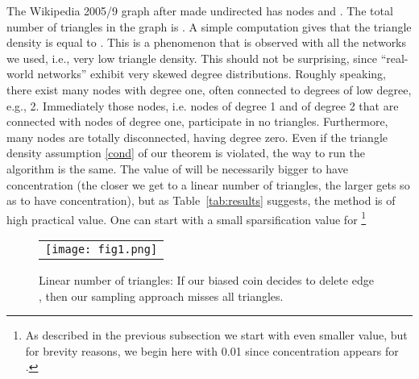 \documentclass{llncs}
\begin{document}
The Wikipedia 2005/9 graph after made undirected has  nodes 
and . The total number of triangles in the graph is .
A simple computation gives that the triangle density  is 
equal to . This is a phenomenon that is observed with all the 
networks we used, i.e., very low triangle density. This should not be surprising, 
since ``real-world networks'' exhibit very skewed degree distributions. 
Roughly speaking, there exist many nodes with degree one, often connected to degrees of low
degree, e.g., 2. Immediately those nodes, i.e. nodes of degree 1 and of degree 2 that 
are connected with nodes of degree one, participate in no triangles. Furthermore, 
many nodes are totally disconnected, having degree zero. 
Even if the triangle density assumption  \eqref{cond} of our theorem is violated, 
the way to run the algorithm is the same. The value of  will be necessarily bigger
to have concentration (the closer we get to a linear number of triangles, the larger  gets
so as to have concentration), but as Table~\ref{tab:results} suggests, the method 
is of high practical value. 
One can start with a small sparsification value for  \footnote{As described in the previous
subsection we start with even smaller value, but for brevity reasons, we begin here with 0.01 since concentration
appears for .}

\begin{figure}
    \begin{center}
        \begin{tabular}{c}
        \texttt{[image: fig1.png]} \\
	  \end{tabular}	    
		\caption{ Linear number of triangles: If our biased coin decides to delete edge , then our sampling approach misses all triangles.  }
		\end{center}
	\label{fig:fig1}
\end{figure}
\end{document}

